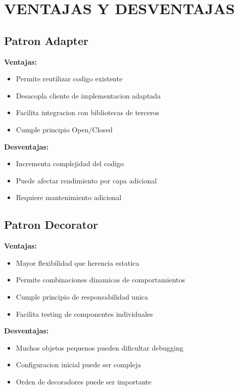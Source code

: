 \documentclass[11pt,a4paper]{article}
\begin{document}
\section{VENTAJAS Y DESVENTAJAS}

\subsection{Patron Adapter}

\textbf{Ventajas:}
\begin{itemize}
    \item Permite reutilizar codigo existente
    \item Desacopla cliente de implementacion adaptada
    \item Facilita integracion con bibliotecas de terceros
    \item Cumple principio Open/Closed
\end{itemize}

\textbf{Desventajas:}
\begin{itemize}
    \item Incrementa complejidad del codigo
    \item Puede afectar rendimiento por capa adicional
    \item Requiere mantenimiento adicional
\end{itemize}

\subsection{Patron Decorator}

\textbf{Ventajas:}
\begin{itemize}
    \item Mayor flexibilidad que herencia estatica
    \item Permite combinaciones dinamicas de comportamientos
    \item Cumple principio de responsabilidad unica
    \item Facilita testing de componentes individuales
\end{itemize}

\textbf{Desventajas:}
\begin{itemize}
    \item Muchos objetos pequenos pueden dificultar debugging
    \item Configuracion inicial puede ser compleja
    \item Orden de decoradores puede ser importante
\end{itemize}
\end{document}
